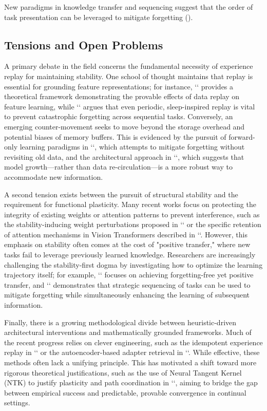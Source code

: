 \documentclass[11pt]{article}
\begin{document}
New paradigms in knowledge transfer and sequencing suggest that the order of task presentation can be leveraged to mitigate forgetting (\citep{2512.16871}).


\subsection{Tensions and Open Problems}

A primary debate in the field concerns the fundamental necessity of experience replay for maintaining stability. One school of thought maintains that replay is essential for grounding feature representations; for instance, `\citep{2602.02767}` provides a theoretical framework demonstrating the provable effects of data replay on feature learning, while `\citep{2606.08447}` argues that even periodic, sleep-inspired replay is vital to prevent catastrophic forgetting across sequential tasks. Conversely, an emerging counter-movement seeks to move beyond the storage overhead and potential biases of memory buffers. This is evidenced by the pursuit of forward-only learning paradigms in `\citep{2509.01533}`, which attempts to mitigate forgetting without revisiting old data, and the architectural approach in `\citep{2509.01213}`, which suggests that model growth—rather than data re-circulation—is a more robust way to accommodate new information.

A second tension exists between the pursuit of structural stability and the requirement for functional plasticity. Many recent works focus on protecting the integrity of existing weights or attention patterns to prevent interference, such as the stability-inducing weight perturbations proposed in `\citep{2503.01595}` or the specific retention of attention mechanisms in Vision Transformers described in `\citep{2602.05454}`. However, this emphasis on stability often comes at the cost of "positive transfer," where new tasks fail to leverage previously learned knowledge. Researchers are increasingly challenging the stability-first dogma by investigating how to optimize the learning trajectory itself; for example, `\citep{2601.05623}` focuses on achieving forgetting-free yet positive transfer, and `\citep{2512.16871}` demonstrates that strategic sequencing of tasks can be used to mitigate forgetting while simultaneously enhancing the learning of subsequent information.

Finally, there is a growing methodological divide between heuristic-driven architectural interventions and mathematically grounded frameworks. Much of the recent progress relies on clever engineering, such as the idempotent experience replay in `\citep{2603.00624}` or the autoencoder-based adapter retrieval in `\citep{2510.21836}`. While effective, these methods often lack a unifying principle. This has motivated a shift toward more rigorous theoretical justifications, such as the use of Neural Tangent Kernel (NTK) to justify plasticity and path coordination in `\citep{2511.02025}`, aiming to bridge the gap between empirical success and predictable, provable convergence in continual settings.
\end{document}

